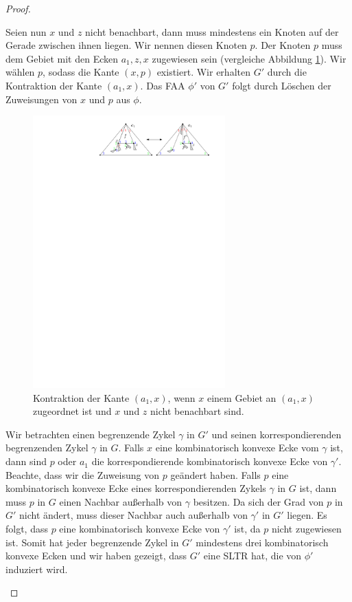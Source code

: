 \begin{proof}
\begin{description}[leftmargin =0pt, font = \rmfamily ]
\item[Fall 2:] Seien nun $x$ und $z$ nicht benachbart, dann muss mindestens ein Knoten auf der Gerade zwischen ihnen liegen. Wir nennen diesen Knoten $p$. Der Knoten $p$ muss dem Gebiet mit den Ecken $a_1,z,x$ zugewiesen sein (vergleiche Abbildung \ref{pic_lem5_10}). Wir wählen $p$, sodass die Kante $(x,p)$ existiert. Wir erhalten $G'$ durch die Kontraktion der Kante $(a_1,x)$. Das FAA $\phi'$ von $G'$ folgt durch Löschen der Zuweisungen von $x$ und $p$ aus $\phi$.

\begin{figure}[h]
\centering
\includegraphics[width=0.66\textwidth]{lem5_10.pdf}
\caption{Kontraktion der Kante $(a_1,x)$, wenn $x$ einem Gebiet an $(a_1,x)$ zugeordnet ist und $x$ und $z$ nicht benachbart sind.}
\label{pic_lem5_10}
\end{figure}

Wir betrachten einen begrenzende Zykel $\gamma$ in $G'$ und seinen korrespondierenden begrenzenden Zykel $\gamma$ in $G$. Falls $x$ eine kombinatorisch konvexe Ecke vom $\gamma$ ist, dann sind $p$ oder $a_1$ die korrespondierende kombinatorisch konvexe Ecke von $\gamma'$. Beachte, dass wir die Zuweisung von $p$ geändert haben. Falls $p$ eine kombinatorisch konvexe Ecke eines korrespondierenden Zykels $\gamma$ in $G$ ist, dann muss $p$ in $G$ einen Nachbar außerhalb von $\gamma$ besitzen. Da sich der Grad von $p$ in $G'$ nicht ändert, muss dieser Nachbar auch außerhalb von $\gamma'$ in $G'$ liegen. Es folgt, dass $p$ eine kombinatorisch konvexe Ecke von $\gamma'$ ist, da $p$ nicht zugewiesen ist. Somit hat jeder begrenzende Zykel in $G'$ mindestens drei kombinatorisch konvexe Ecken und wir haben gezeigt, dass $G'$ eine SLTR hat, die von $\phi'$ induziert wird.


\end{description}
\end{proof}
